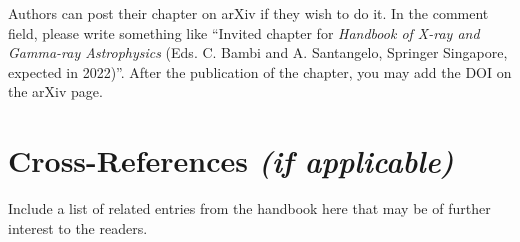 \documentclass[graybox, nosecnum]{svmult}
\begin{document}
\vspace{0.1cm}

{Authors can post their chapter on arXiv if they wish to do it. In the comment field, please write something like ``Invited chapter for {\it Handbook of X-ray and Gamma-ray Astrophysics} (Eds. C. Bambi and A. Santangelo, Springer Singapore, expected in 2022)''. After the publication of the chapter, you may add the DOI on the arXiv page.}



\section{Cross-References \textit{(if applicable)}}
Include a list of related entries from the handbook here that may be of further interest to the readers.



\end{document}
